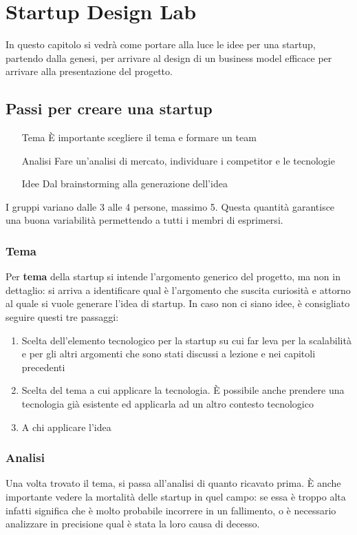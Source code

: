 \chapter{Startup Design Lab}

In questo capitolo si vedrà come portare alla luce le idee per una startup,
partendo dalla genesi, per arrivare al design di un business model efficace per
arrivare alla presentazione del progetto.

\section{Passi per creare una startup}

\begin{itemize}
 \item[Tema] È importante scegliere il tema e formare un team
 \item[Analisi] Fare un'analisi di mercato, individuare i competitor e le
tecnologie
 \item[Idee] Dal brainstorming alla generazione dell'idea
\end{itemize}


I gruppi variano dalle 3 alle 4 persone, massimo 5. Questa quantità garantisce
una buona variabilità permettendo a tutti i membri di esprimersi.

\subsection{Tema}
Per \textbf{tema} della startup si intende l'argomento generico del progetto,
ma non in dettaglio: si arriva a identificare qual è l'argomento che suscita
curiosità e attorno al quale si vuole generare l'idea di startup. In caso non
ci siano idee, è consigliato seguire questi tre passaggi:
\begin{enumerate}
 \item Scelta dell'elemento tecnologico per la startup su cui far leva per la
scalabilità e per gli altri argomenti che sono stati discussi a lezione e nei
capitoli precedenti
 \item Scelta del tema a cui applicare la tecnologia. È possibile anche
prendere una tecnologia già esistente ed applicarla ad un altro contesto
tecnologico
 \item A chi applicare l'idea
\end{enumerate}

\subsection{Analisi}
Una volta trovato il tema, si passa all'analisi di quanto ricavato prima.
È anche importante vedere la mortalità delle startup in quel campo: se essa è
troppo alta infatti significa che è molto probabile incorrere in un fallimento,
o è necessario analizzare in precisione qual è stata la loro causa di decesso.

